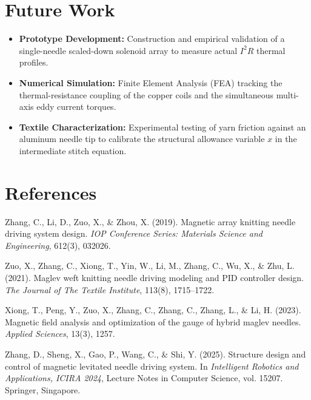 \documentclass[10pt]{article}
\begin{document}
\section{Future Work}
\begin{itemize}
  \item \textbf{Prototype Development:} Construction and empirical validation of a single-needle scaled-down solenoid array to measure actual $I^2R$ thermal profiles.
  \item \textbf{Numerical Simulation:} Finite Element Analysis (FEA) tracking the thermal-resistance coupling of the copper coils and the simultaneous multi-axis eddy current torques.
  \item \textbf{Textile Characterization:} Experimental testing of yarn friction against an aluminum needle tip to calibrate the structural allowance variable $x$ in the intermediate stitch equation.
\end{itemize}

\section*{References}
\begin{enumerate}[label={[\arabic*]}, leftmargin=2em, itemsep=0.5em]
  \item Zhang, C., Li, D., Zuo, X., \& Zhou, X. (2019). Magnetic array knitting needle driving system design. \textit{IOP Conference Series: Materials Science and Engineering}, 612(3), 032026.
  \item Zuo, X., Zhang, C., Xiong, T., Yin, W., Li, M., Zhang, C., Wu, X., \& Zhu, L. (2021). Maglev weft knitting needle driving modeling and PID controller design. \textit{The Journal of The Textile Institute}, 113(8), 1715--1722.
  \item Xiong, T., Peng, Y., Zuo, X., Zhang, C., Zhang, C., Zhang, L., \& Li, H. (2023). Magnetic field analysis and optimization of the gauge of hybrid maglev needles. \textit{Applied Sciences}, 13(3), 1257.
  \item Zhang, D., Sheng, X., Gao, P., Wang, C., \& Shi, Y. (2025). Structure design and control of magnetic levitated needle driving system. In \textit{Intelligent Robotics and Applications, ICIRA 2024}, Lecture Notes in Computer Science, vol. 15207. Springer, Singapore.
\end{enumerate}
\end{document}
